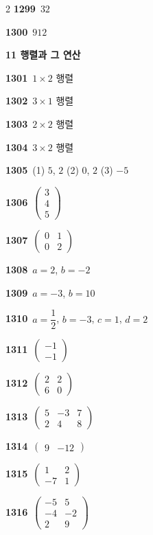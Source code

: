 \documentclass[10pt,a4paper]{article}
\begin{document}
\begin{multicols}{2}
\noindent\textbf{1299}\ $32$\par
\noindent\textbf{1300}\ $912$\par
\noindent\textbf{11 행렬과 그 연산}\par\smallskip
\noindent\textbf{1301}\ $1\times 2$ 행렬\par
\noindent\textbf{1302}\ $3\times 1$ 행렬\par
\noindent\textbf{1303}\ $2\times 2$ 행렬\par
\noindent\textbf{1304}\ $3\times 2$ 행렬\par
\noindent\textbf{1305}\ (1) $5$, $2$ (2) $0$, $2$ (3) $-5$\par
\noindent\textbf{1306}\ $\begin{pmatrix} 3 \\ 4 \\ 5 \end{pmatrix}$\par
\noindent\textbf{1307}\ $\begin{pmatrix} 0 & 1 \\ 0 & 2 \end{pmatrix}$\par
\noindent\textbf{1308}\ $a=2$, $b=-2$\par
\noindent\textbf{1309}\ $a=-3$, $b=10$\par
\noindent\textbf{1310}\ $a=\dfrac{1}{2}$, $b=-3$, $c=1$, $d=2$\par
\noindent\textbf{1311}\ $\begin{pmatrix} -1 \\ -1 \end{pmatrix}$\par
\noindent\textbf{1312}\ $\begin{pmatrix} 2 & 2 \\ 6 & 0 \end{pmatrix}$\par
\noindent\textbf{1313}\ $\begin{pmatrix} 5 & -3 & 7 \\ 2 & 4 & 8 \end{pmatrix}$\par
\noindent\textbf{1314}\ $\begin{pmatrix} 9 & -12 \end{pmatrix}$\par
\noindent\textbf{1315}\ $\begin{pmatrix} 1 & 2 \\ -7 & 1 \end{pmatrix}$\par
\noindent\textbf{1316}\ $\begin{pmatrix} -5 & 5 \\ -4 & -2 \\ 2 & 9 \end{pmatrix}$\par

\end{multicols}
\end{document}
